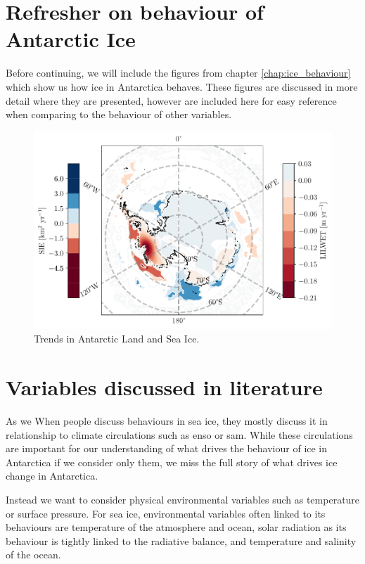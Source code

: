 \documentclass[../main.tex]{subfiles}
\begin{document}
\section{Refresher on behaviour of Antarctic Ice}
Before continuing, we will include the figures from chapter \ref{chap:ice_behaviour} which show us how ice in Antarctica behaves. These figures are discussed in more detail where they are presented, however are included here for easy reference when comparing to the behaviour of other variables.
\begin{figure}[hbt!]
    \centering
    \includegraphics{images/T2/individually_made/hres/combined_ice_trend_0.05}
    \caption{Trends in Antarctic Land and Sea Ice.}
    \label{fig:combined_ice_trend_0}
\end{figure}

\section{Variables discussed in literature}
As we When people discuss behaviours in sea ice, they mostly discuss it in relationship to climate circulations such as \gls{enso} or \gls{sam}. While these circulations are important for our understanding of what drives the behaviour of ice in Antarctica if we consider only them, we miss the full story of what drives ice change in Antarctica. 

Instead we want to consider physical environmental variables such as temperature or surface pressure. For sea ice, environmental variables often linked to its behaviours are temperature of the atmosphere and ocean, solar radiation as its behaviour is tightly linked to the radiative balance, and temperature and salinity of the ocean. 
\end{document}
